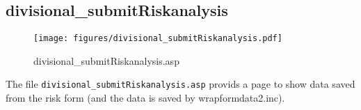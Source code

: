 \subsection{divisional\_submitRiskanalysis}
\begin{figure}[htb]
    \begin{center}
        \texttt{[image: figures/divisional\_submitRiskanalysis.pdf]}
    \end{center}
    \caption{divisional\_submitRiskanalysis.asp}
    \label{fig:divisional_submitRiskanalysis}
\end{figure}

The file \verb|divisional_submitRiskanalysis.asp| provids a page to show data
saved from the risk form (and the data is saved by wrapformdata2.inc).
